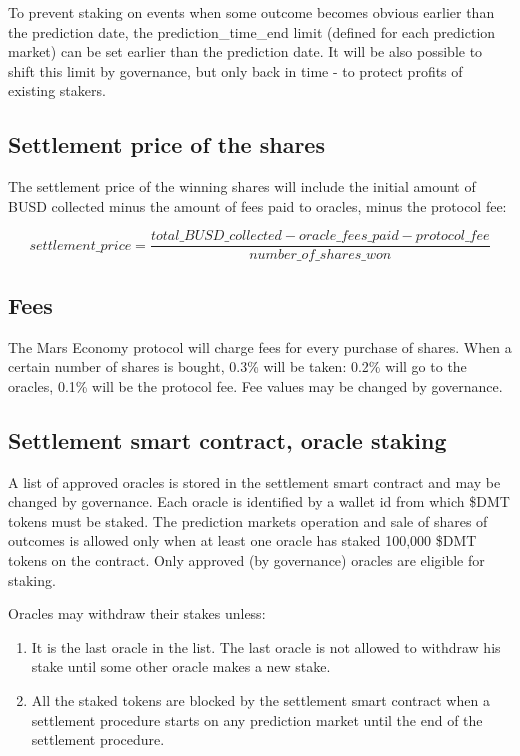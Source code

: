 \documentclass[12pt]{article}
\begin{document}
To prevent staking on events when some outcome becomes obvious earlier than the prediction date, the prediction\_time\_end limit (defined for each prediction market) can be set earlier than the prediction date. It will be also possible to shift this limit by governance, but only back in time - to protect profits of existing stakers.

\subsection{Settlement price of the shares}
The settlement price of the winning shares will include the initial amount of BUSD collected minus the amount of fees paid to oracles, minus the protocol fee:

\[ settlement\_price = \frac{total\_BUSD\_collected - oracle\_fees\_paid - protocol\_fee}{number\_of\_shares\_won} \]

\subsection{Fees}
The Mars Economy protocol will charge fees for every purchase of shares. When a certain number of shares is bought, 0.3\% will be taken: 0.2\% will go to the oracles, 0.1\% will be the protocol fee. Fee values may be changed by governance.

\subsection{Settlement smart contract, oracle staking}
A list of approved oracles is stored in the settlement smart contract and may be changed by governance. Each oracle is identified by a wallet id from which \$DMT tokens must be staked. The prediction markets operation and sale of shares of outcomes is allowed only when at least one oracle has staked 100,000 \$DMT tokens on the contract. Only approved (by governance) oracles are eligible for staking. 

Oracles may withdraw their stakes unless:
\begin{enumerate}
\item It is the last oracle in the list. The last oracle is not allowed to withdraw his stake until some other oracle makes a new stake.
\item All the staked tokens are blocked by the settlement smart contract when a settlement procedure starts on any prediction market until the end of the settlement procedure.
\end{enumerate}
\end{document}
